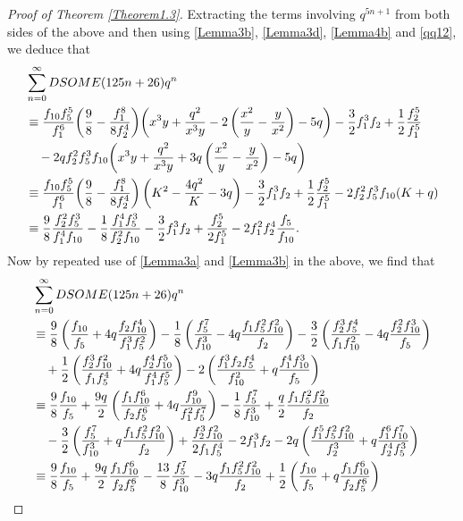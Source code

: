 \documentclass[12pt]{amsart}
\theoremstyle{definition}
\numberwithin{equation}{section}
\begin{document}
\begin{proof}[Proof of Theorem \ref{Theorem1.3}]
    Extracting the terms  involving $q^{5n+1}$ from both sides of the above and then using \eqref{Lemma3b}, \eqref{Lemma3d}, \eqref{Lemma4b} and \eqref{qq12}, we deduce that
\begin{align*} &\sum_{n=0}^{\infty}DSOME(125n+26)q^n\\
&\equiv \frac{f_{10}f_5^5}{f_1^6}\bigg(\frac{9}{8}-\frac{f_1^8}{8f_2^4}\bigg)\bigg(x^3y+\frac{q^2}{x^3y}-2\left(\frac{x^2}{y}-\frac{y}{x^2}\right)-5q\bigg)
-\frac{3}{2}f_1^3f_2+\frac{1}{2}\frac{f_2^5}{f_1^5}
     \notag\\    &\quad-2qf_2^2f_5^3f_{10}\bigg(x^3y+\frac{q^2}{x^3y}+3q\left(\frac{x^2}{y}-\frac{y}{x^2}\right)-5q\bigg)\\
     &\equiv \frac{f_{10}f_5^5}{f_1^6}\bigg(\frac{9}{8}-\frac{f_1^8}{8f_2^4}\bigg)\left(K^2-\dfrac{4q^2}{K}-3q\right)
-\frac{3}{2}f_1^3f_2+\frac{1}{2}\frac{f_2^5}{f_1^5}-2f_2^2f_5^3f_{10}(K+q)\\
&\equiv \frac{9}{8}\frac{f_2^2f_5^3}{f_1^4f_{10}}-\frac{1}{8}\frac{f_1^4f_5^3}{f_2^2f_{10}}-\frac{3}{2}f_1^3f_2+\frac{f_2^5}{2f_1^5}-2f_1^2f_2^4\frac{f_5}{f_{10}}.
     \end{align*}
    Now by repeated use of \eqref{Lemma3a} and \eqref{Lemma3b} in the above, we find that 
     \begin{align}
     \label{mod8gen}&\sum_{n=0}^{\infty}DSOME(125n+26)q^n\\   
     &\equiv\frac{9}{8}\left(\frac{f_{10}}{f_5}+4q\frac{f_2f_{10}^4}{f_1^3f_5^2}\right)-\frac{1}{8}\left(\frac{f_5^7}{f_{10}^3}-4q\frac{f_1f_5^2f_{10}^2}{f_2}\right)-\frac{3}{2}\left(\frac{f_2^3f_5^4}{f_1f_{10}^2}-4q\frac{f_2^2f_{10}^3}{f_5}\right)\notag\\
     &\quad+\frac{1}{2}\left(\frac{f_2^3f_{10}^2}{f_1f_5^4}+4q\frac{f_2^4f_{10}^5}{f_1^4f_5^5}\right)-2\left(\frac{f_1^3f_2f_5^4}{f_{10}^2}+q\frac{f_1^4f_{10}^3}{f_5}\right)\notag\\
       &\equiv\frac{9}{8}\frac{f_{10}}{f_5}+\frac{9q}{2}\left(\frac{f_1f_{10}^6}{f_2f_5^6}+4q\frac{f_{10}^9}{f_1^2f_5^7}\right)-\frac{1}{8}\frac{f_5^7}{f_{10}^3}+\frac{q}{2}\frac{f_1f_5^2f_{10}^2}{f_2}\notag\\
         &\quad-\frac{3}{2}\left(\frac{f_5^7}{f_{10}^3}+q\frac{f_1f_5^2f_{10}^2}{f_2}\right)+\frac{f_2^3f_{10}^2}{2f_1f_5^4}-2f_1^3f_2-2q\left(\frac{f_1^5f_5^2f_{10}^2}{f_2^3}+q\frac{f_1^6f_{10}^7}{f_2^4f_5^3}\right)\notag\\
         &\equiv\frac{9}{8}\frac{f_{10}}{f_5}+\frac{9q}{2}\frac{f_1f_{10}^6}{f_2f_5^6}-\frac{13}{8}\frac{f_5^7}{f_{10}^3}-3q\frac{f_1f_5^2f_{10}^2}{f_2}+\frac{1}{2}\left(\frac{f_{10}}{f_5}+q\frac{f_1f_{10}^6}{f_2f_5^6}\right)\notag\\

\end{align}
\end{proof}
\end{document}

